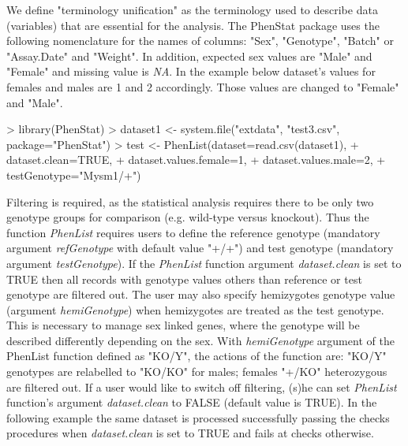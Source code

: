 \documentclass[a4paper]{article}
\begin{document}
We define "terminology unification" as the terminology used to describe data (variables) that are essential for the analysis. The PhenStat package uses the following nomenclature for the names of columns: "Sex", "Genotype", "Batch" or "Assay.Date" and "Weight". In addition, expected sex values are "Male" and "Female" and missing value is \textit{NA}. 
\newline\newline
In the example below dataset's values for females and males are 1 and 2 accordingly. Those values are changed to "Female" and "Male".  
\begin{Schunk}
\begin{Sinput}
> library(PhenStat)
> dataset1 <- system.file("extdata", "test3.csv", package="PhenStat")
> test <- PhenList(dataset=read.csv(dataset1), 
+         dataset.clean=TRUE, 
+         dataset.values.female=1, 
+         dataset.values.male=2, 
+         testGenotype="Mysm1/+")
\end{Sinput}
\end{Schunk}
Filtering is required, as the statistical analysis requires there to be only two genotype groups for comparison (e.g. wild-type versus knockout). Thus the function \textit{PhenList} requires users to define the reference genotype (mandatory argument \textit{refGenotype} with default value "+\slash+") and test genotype (mandatory argument \textit{testGenotype}). 
If the \textit{PhenList} function argument \textit{dataset.clean} is set to TRUE then all records with genotype values others than reference or test genotype are filtered out. 
The user may also specify hemizygotes genotype value (argument \textit{hemiGenotype}) when hemizygotes are treated as the test genotype. 
This is necessary to manage sex linked genes, where the genotype will be described differently depending on the sex. 
\newline\newline
With \textit{hemiGenotype} argument of the PhenList function defined as "KO\slash Y", the actions of the function are:  "KO/Y" genotypes are relabelled to "KO/KO" for males;  females "+\slash KO" heterozygous are filtered out. 
\newline\newline
If a user would like to switch off filtering, (s)he can set \textit{PhenList} function's argument \textit{dataset.clean} to FALSE (default value is TRUE). 
In the following example the same dataset is processed successfully passing the checks procedures when \textit{dataset.clean} is set to TRUE and fails at checks otherwise.
\end{document}
